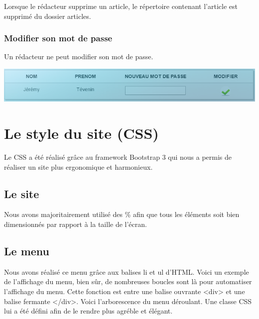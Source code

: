 \documentclass[hidelinks, 12pt,a4paper]{article}
\begin{document}
Lorsque le rédacteur supprime un article, le répertoire contenant l'article est supprimé du dossier articles.

\subsubsection{Modifier son mot de passe}
Un rédacteur ne peut modifier son mot de passe.\\
\begin{center}
\includegraphics[width=16cm]{images/modifauteur.png}\\
\end{center}


\newpage
\section{Le style du site (CSS)}
Le CSS a été réalisé grâce au framework Bootstrap 3 qui nous a permis de réaliser un site plus ergonomique et harmonieux.
\subsection{Le site}
Nous avons majoritairement utilisé des \% afin que tous les éléments soit bien dimensionnés par rapport à la taille de l'écran.
\subsection{Le menu}
Nous avons réalisé ce menu grâce aux balises li et ul d'HTML. Voici un exemple de l’affichage du menu, bien sûr, de nombreuses boucles sont là pour automatiser l'affichage du menu. Cette fonction est entre une balise ouvrante <div> et une balise fermante </div>. 
Voici l'arborescence du menu déroulant. Une classe CSS lui a été défini afin de le rendre plus agréble et élégant.
\end{document}
